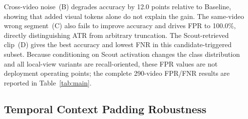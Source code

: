 \begin{table}[t]
  \centering
  \caption{Input content ablation (4B+Minimal, 100 videos where Scout triggered: 72 anomaly + 28 normal). Only Source~2 content varies; global video, prompt, and token budget ($L+\delta$) are held constant.}
  \label{tab:input_content}
\end{table}

Cross-video noise~(B) degrades accuracy by 12.0 points relative to Baseline, showing that added visual tokens alone do not explain the gain. The same-video wrong segment~(C) also fails to improve accuracy and drives FPR to 100.0\%, directly distinguishing ATR from arbitrary truncation. The Scout-retrieved clip~(D) gives the best accuracy and lowest FNR in this candidate-triggered subset. Because conditioning on Scout activation changes the class distribution and all local-view variants are recall-oriented, these FPR values are not deployment operating points; the complete 290-video FPR/FNR results are reported in Table~\ref{tab:main}.

\subsection{Temporal Context Padding Robustness}
\label{sec:ace_ablation}

\begin{table}[h]
  \centering
  \caption{Equal-budget temporal context padding on the frozen paired subset ($N=178$; 89 anomaly and 89 normal videos). All conditions reuse the same Scout candidates. Entries are balanced accuracy.}
  \label{tab:ace_ablation}
\end{table}

